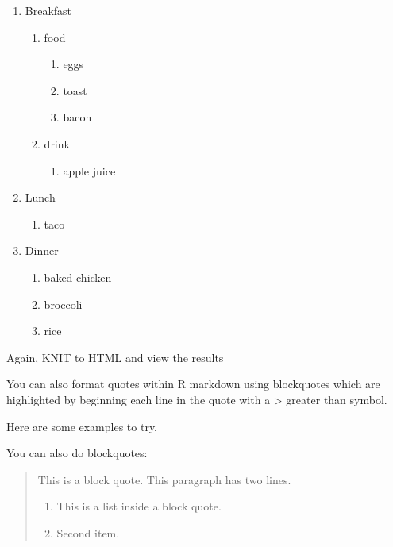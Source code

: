 \documentclass[
]{book}
\providecommand{\tightlist}{%
  \setlength{\itemsep}{0pt}\setlength{\parskip}{0pt}}
\begin{document}
\begin{enumerate}
\def\labelenumi{\arabic{enumi}.}
\tightlist
\item
  Breakfast

  \begin{enumerate}
  \def\labelenumii{\alph{enumii}.}
  \tightlist
  \item
    food

    \begin{enumerate}
    \def\labelenumiii{\roman{enumiii}.}
    \tightlist
    \item
      eggs
    \item
      toast
    \item
      bacon
    \end{enumerate}
  \item
    drink

    \begin{enumerate}
    \def\labelenumiii{\roman{enumiii}.}
    \tightlist
    \item
      apple juice
    \end{enumerate}
  \end{enumerate}
\item
  Lunch

  \begin{enumerate}
  \def\labelenumii{\alph{enumii}.}
  \tightlist
  \item
    taco
  \end{enumerate}
\item
  Dinner

  \begin{enumerate}
  \def\labelenumii{\alph{enumii}.}
  \tightlist
  \item
    baked chicken
  \item
    broccoli
  \item
    rice
  \end{enumerate}
\end{enumerate}

Again, KNIT to HTML and view the results

You can also format quotes within R markdown using blockquotes which are highlighted by beginning each line in the quote with a \textgreater{} greater than symbol.

Here are some examples to try.

You can also do blockquotes:

\begin{quote}
This is a block quote. This
paragraph has two lines.

\begin{enumerate}
\def\labelenumi{\arabic{enumi}.}
\tightlist
\item
  This is a list inside a block quote.
\item
  Second item.
\end{enumerate}
\end{quote}
\end{document}
